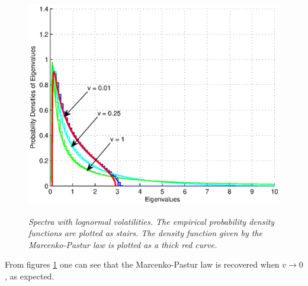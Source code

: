 \documentclass{article}
\begin{document}
\begin{figure}[htb!]
{    \includegraphics[scale=0.35]{../pics/Lognormal_q0.5.eps}
    \label{fig:Lognormal_q0.5}
  }
  \caption{\small \it Spectra with lognormal volatilities. The
    empirical probability density functions are plotted as stairs. The
  density function given by the Marcenko-Pastur law is plotted as a
  thick red curve.}
  \label{fig:LognormalSpectra}
\end{figure}
From figures \ref{fig:LognormalSpectra} one can see that the
Marcenko-Pastur law is recovered when $v \to 0$, as expected.
\end{document}
